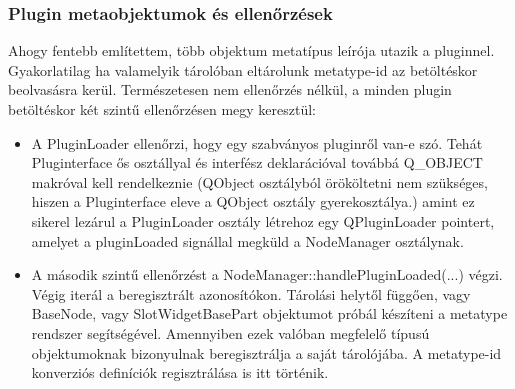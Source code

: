 \documentclass[a4paper,12pt,oneside]{report}
\begin{document}
\subsubsection{Plugin metaobjektumok és ellenőrzések}
Ahogy fentebb említettem, több objektum metatípus leírója utazik a pluginnel. Gyakorlatilag ha valamelyik tárolóban eltárolunk metatype-id az betöltéskor beolvasásra kerül. Természetesen nem ellenőrzés nélkül, a minden plugin betöltéskor két szintű ellenőrzésen megy keresztül:
\begin{itemize}
	\itemsep0em
	\item A PluginLoader ellenőrzi, hogy egy szabványos pluginről van-e szó. Tehát Pluginterface ős osztállyal és interfész deklarációval továbbá Q\_OBJECT makróval kell rendelkeznie (QObject osztályból örököltetni nem szükséges, hiszen a Pluginterface eleve a QObject osztály gyerekosztálya.) amint ez sikerel lezárul a PluginLoader osztály létrehoz egy QPluginLoader pointert, amelyet a pluginLoaded signállal megküld a NodeManager osztálynak.
	\item A második szintű ellenőrzést a NodeManager::handlePluginLoaded(...) végzi. Végig iterál a beregisztrált azonosítókon. Tárolási helytől függően, vagy BaseNode, vagy SlotWidgetBasePart objektumot próbál készíteni a metatype rendszer segítségével. Amennyiben ezek valóban megfelelő típusú objektumoknak bizonyulnak beregisztrálja a saját tárolójába. A metatype-id konverziós definíciók regisztrálása is itt történik.
\end{itemize}
\end{document}

